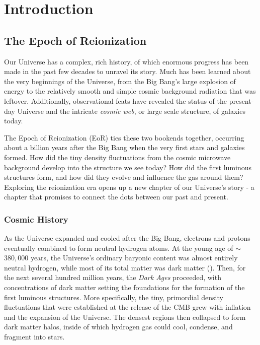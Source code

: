 \chapter{Introduction}
\label{c.intro}

\section{The Epoch of Reionization}

Our Universe has a complex, rich history, of which enormous progress has been made in the past few decades to unravel its story. Much has been learned about the very beginnings of the Universe, from the Big Bang's large explosion of energy to the relatively smooth and simple cosmic background radiation that was leftover. Additionally, observational feats have revealed the status of the present-day Universe and the intricate \textit{cosmic web}, or large scale structure, of galaxies today. 

The Epoch of Reionization (EoR) ties these two bookends together, occurring about a billion years after the Big Bang when the very first stars and galaxies formed. How did the tiny density fluctuations from the cosmic microwave background develop into the structure we see today? How did the first luminous structures form, and how did they evolve and influence the gas around them? Exploring the reionization era opens up a new chapter of our Universe's story - a chapter that promises to connect the dots between our past and present.

\subsection{Cosmic History}

As the Universe expanded and cooled after the Big Bang, electrons and protons eventually combined to form neutral hydrogen atoms. At the young age of $\sim$ $380,000$ years, the Universe's ordinary baryonic content was almost entirely neutral hydrogen, while most of its total matter was dark matter (\citealt{loeb_furlanetto_2013}). Then, for the next several hundred million years, the \textit{Dark Ages} proceeded, with concentrations of dark matter setting the foundations for the formation of the first luminous structures. More specifically, the tiny, primordial density fluctuations that were established at the release of the CMB grew with inflation and the expansion of the Universe. The densest regions then collapsed to form dark matter halos, inside of which hydrogen gas could cool, condense, and fragment into stars.

